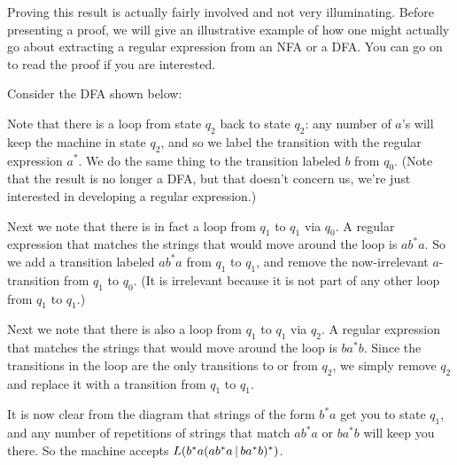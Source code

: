 Proving this result is actually fairly involved and not very illuminating. 
Before presenting a proof, we will give an illustrative example of how one
might actually go about extracting a regular expression from an NFA or a DFA.
You can go on to read the proof if you are interested.

\begin{example}
Consider
the DFA shown below:


Note that there is a loop from state $q_2$ back to state $q_2$: any number of
$a$'s will keep the machine in state $q_2$, and so we label the transition with
the regular expression $a^*$.  We do the same thing to the transition labeled
$b$ from $q_0$.  (Note that the result is no longer a DFA, but that doesn't
concern us, we're just interested in developing a regular expression.)


Next we note that there is in fact a loop from $q_1$ to $q_1$ via $q_0$.  A
regular expression that matches the strings that would move around the loop is
$ab^*a$.  So we add a transition labeled $ab^*a$ from $q_1$ to
$q_1$, and remove the now-irrelevant $a$-transition from $q_1$ to $q_0$.  (It is
irrelevant because it is not part of any other loop from $q_1$ to 
$q_1$.)

  
Next we note that there is also a loop from $q_1$ to $q_1$ via $q_2$.  A
regular expression that matches the strings that would move around the loop is
$ba^*b$.  Since the transitions in the loop are the only transitions to or from
$q_2$, we simply remove $q_2$ and replace it with a transition from $q_1$ to
$q_1$.


It is now clear from the diagram that strings of the form $b^*a$ get you to
state $q_1$, and any number of repetitions of strings that match $ab^*a$ or
$ba^*b$ will keep you there.  So the machine accepts $L(b^*a(ab^*a\hbox{$\,|\,$} ba^*b)^*)$. 
\end{example}




